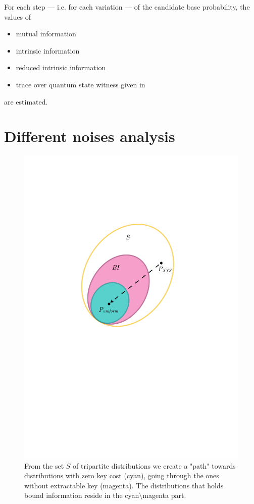     For each step --- i.e. for each variation --- of the candidate base probability, the values of 
    \begin{itemize}
    	\item	mutual information
    	\item	intrinsic information
    	\item	reduced intrinsic information
    	\item	trace over quantum state witness given in \cite{DPS04}
    \end{itemize}
    are estimated.
\section{Different noises analysis}

	\begin{figure}[h!]
		\centering
		\includegraphics[scale=0.5]{images/analysis-path}
		\caption{From the set $S$ of tripartite distributions we create a "path"
towards distributions with zero key cost (cyan), going through the ones without extractable key (magenta). The distributions that holds bound information reside in the cyan$\setminus$magenta part.}
		\label{Fig:analysis-path}
	\end{figure}
